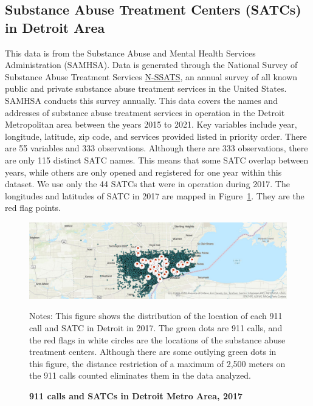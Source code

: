\documentclass[12pt]{article}
\begin{document}
\subsection{Substance Abuse Treatment Centers (SATCs) in Detroit Area}

This data is from the Substance Abuse and Mental Health Services Administration (SAMHSA). Data is generated through the National Survey of Substance Abuse Treatment Services \href{https://www.samhsa.gov/data/data-we-collect/n-ssats-national-survey-substance-abuse-treatment-services}{N-SSATS}, an annual survey of all known public and private substance abuse treatment services in the United States. SAMHSA conducts this survey annually.  This data covers the names and addresses of substance abuse treatment services in operation in the Detroit Metropolitan area between the years 2015 to 2021. Key variables include year, longitude, latitude, zip code, and services provided listed in priority order. There are 55 variables and 333 observations. Although there are 333 observations, there are only 115 distinct SATC names. This means that some SATC overlap between years, while others are only opened and registered for one year within this dataset.\footnotemark[2] We use only the 44 SATCs that were in operation during 2017. The longitudes and latitudes of SATC in 2017 are mapped in Figure~\ref{fig:Figure1}. They are the red flag points. 

\begin{figure}[h!]
    \centering
\includegraphics[width=0.75\linewidth]{Reproducibility Package/Visual Graphics/ArcGIS_Map.jpg}
    \caption{\textbf{911 calls and SATCs in Detroit Metro Area, 2017}}
    \label{fig:Figure1}
     \centering\footnotesize{Notes: This figure shows the distribution of the location of each 911 call and SATC in Detroit in 2017. The green dots are 911 calls, and the red flags in white circles are the locations of the substance abuse treatment centers. Although there are some outlying green dots in this figure, the distance restriction of a maximum of 2,500 meters on the 911 calls counted eliminates them in the data analyzed.}
    
\end{figure}
\end{document}

